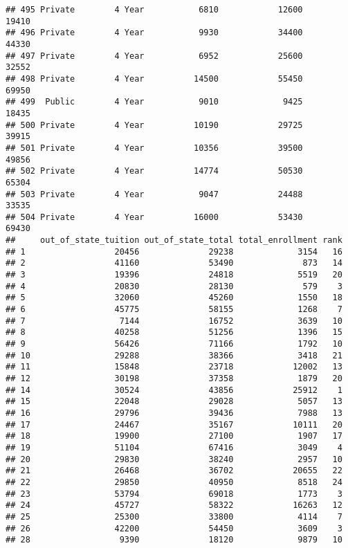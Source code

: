 \documentclass[
]{article}
\begin{document}
\begin{verbatim}
## 495 Private        4 Year           6810            12600          19410
## 496 Private        4 Year           9930            34400          44330
## 497 Private        4 Year           6952            25600          32552
## 498 Private        4 Year          14500            55450          69950
## 499  Public        4 Year           9010             9425          18435
## 500 Private        4 Year          10190            29725          39915
## 501 Private        4 Year          10356            39500          49856
## 502 Private        4 Year          14774            50530          65304
## 503 Private        4 Year           9047            24488          33535
## 504 Private        4 Year          16000            53430          69430
##     out_of_state_tuition out_of_state_total total_enrollment rank
## 1                  20456              29238             3154   16
## 2                  41160              53490              873   14
## 3                  19396              24818             5519   20
## 4                  20830              28130              579    3
## 5                  32060              45260             1550   18
## 6                  45775              58155             1268    7
## 7                   7144              16752             3639   10
## 8                  40258              51256             1396   15
## 9                  56426              71166             1792   10
## 10                 29288              38366             3418   21
## 11                 15848              23718            12002   13
## 12                 30198              37358             1879   20
## 14                 30524              43856            25912    1
## 15                 22048              29028             5057   13
## 16                 29796              39436             7988   13
## 17                 24467              35167            10111   20
## 18                 19900              27100             1907   17
## 19                 51104              67416             3049    4
## 20                 29830              38240             2957   10
## 21                 26468              36702            20655   22
## 22                 29850              40950             8518   24
## 23                 53794              69018             1773    3
## 24                 45727              58322            16263   12
## 25                 25300              33800             4114    7
## 26                 42200              54450             3609    3
## 28                  9390              18120             9879   10

\end{verbatim}
\end{document}
